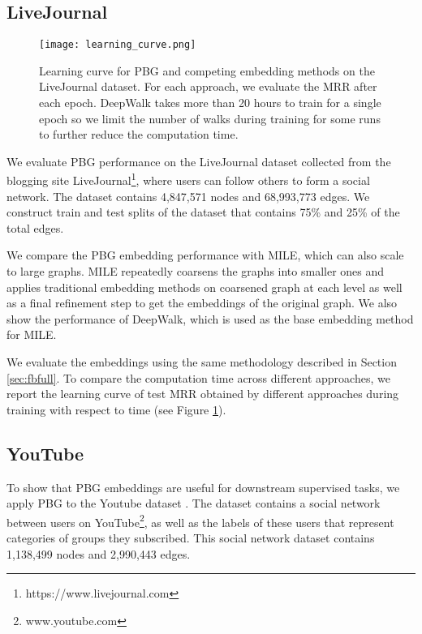 \documentclass{article}
\begin{document}
\subsection{LiveJournal}

\begin{figure}[t]
\texttt{[image: learning\_curve.png]}
\vspace{-6mm}
\caption{Learning curve for PBG and competing embedding methods on the LiveJournal dataset. For each approach, we evaluate the MRR after each epoch. DeepWalk takes more than 20 hours to train for a single epoch so we limit the number of walks during training for some runs to further reduce the computation time.}
\vspace{-3mm}
\label{fig:learning_curve_livejournal}
\end{figure}

We evaluate PBG performance on the LiveJournal dataset \cite{backstrom2006group,leskovec2009community} collected from the blogging site LiveJournal\footnote{https://www.livejournal.com}, where users can follow others to form a social network. The dataset contains 4,847,571 nodes and 68,993,773 edges. We construct train and test splits of the dataset that contains 75\% and 25\% of the total edges. 

We compare the PBG embedding performance with MILE, which can also scale to large graphs. MILE repeatedly coarsens the graphs into smaller ones and applies traditional embedding methods on coarsened graph at each level as well as a final refinement step to get the embeddings of the original graph. We also show the performance of DeepWalk, which is used as the base embedding method for MILE.

We evaluate the embeddings using the same methodology described in Section \ref{sec:fbfull}. To compare the computation time across different approaches, we report the learning curve of test MRR obtained by different approaches during training with respect to time (see Figure \ref{fig:learning_curve_livejournal}).

\subsection{YouTube}
To show that PBG embeddings are useful for downstream supervised tasks, we apply PBG to the Youtube dataset \cite{tang2009scalable}. The dataset contains a social network between users on YouTube\footnote{www.youtube.com}, as well as the labels of these users that represent categories of groups they subscribed. This social network dataset contains 1,138,499 nodes and 2,990,443 edges. 
\end{document}
